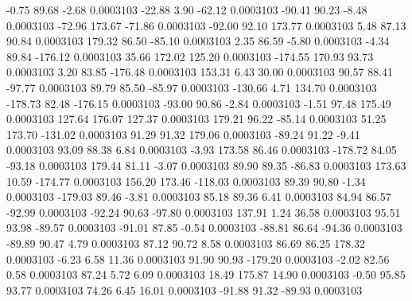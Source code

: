        -0.75       89.68       -2.68     0.0003103
      -22.88        3.90      -62.12     0.0003103
      -90.41       90.23       -8.48     0.0003103
      -72.96      173.67      -71.86     0.0003103
      -92.00       92.10      173.77     0.0003103
        5.48       87.13       90.84     0.0003103
      179.32       86.50      -85.10     0.0003103
        2.35       86.59       -5.80     0.0003103
       -4.34       89.84     -176.12     0.0003103
       35.66      172.02      125.20     0.0003103
     -174.55      170.93       93.73     0.0003103
        3.20       83.85     -176.48     0.0003103
      153.31        6.43       30.00     0.0003103
       90.57       88.41      -97.77     0.0003103
       89.79       85.50      -85.97     0.0003103
     -130.66        4.71      134.70     0.0003103
     -178.73       82.48     -176.15     0.0003103
      -93.00       90.86       -2.84     0.0003103
       -1.51       97.48      175.49     0.0003103
      127.64      176.07      127.37     0.0003103
      179.21       96.22      -85.14     0.0003103
       51.25      173.70     -131.02     0.0003103
       91.29       91.32      179.06     0.0003103
      -89.24       91.22       -9.41     0.0003103
       93.09       88.38        6.84     0.0003103
       -3.93      173.58       86.46     0.0003103
     -178.72       84.05      -93.18     0.0003103
      179.44       81.11       -3.07     0.0003103
       89.90       89.35      -86.83     0.0003103
      173.63       10.59     -174.77     0.0003103
      156.20      173.46     -118.03     0.0003103
       89.39       90.80       -1.34     0.0003103
     -179.03       89.46       -3.81     0.0003103
       85.18       89.36        6.41     0.0003103
       84.94       86.57      -92.99     0.0003103
      -92.24       90.63      -97.80     0.0003103
      137.91        1.24       36.58     0.0003103
       95.51       93.98      -89.57     0.0003103
      -91.01       87.85       -0.54     0.0003103
      -88.81       86.64      -94.36     0.0003103
      -89.89       90.47        4.79     0.0003103
       87.12       90.72        8.58     0.0003103
       86.69       86.25      178.32     0.0003103
       -6.23        6.58       11.36     0.0003103
       91.90       90.93     -179.20     0.0003103
       -2.02       82.56        0.58     0.0003103
       87.24        5.72        6.09     0.0003103
       18.49      175.87       14.90     0.0003103
       -0.50       95.85       93.77     0.0003103
       74.26        6.45       16.01     0.0003103
      -91.88       91.32      -89.93     0.0003103
